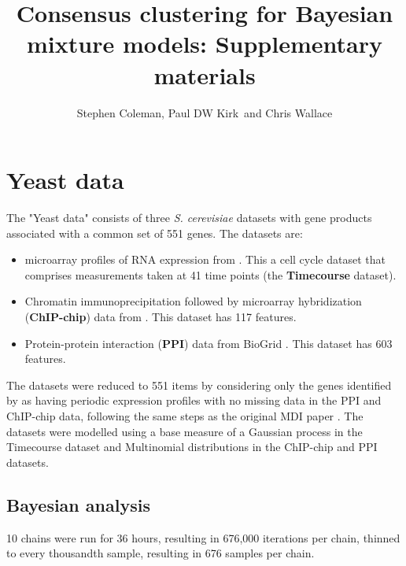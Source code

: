 \documentclass[]{article}
\title{Consensus clustering for Bayesian mixture models: Supplementary materials}
\author{Stephen Coleman, Paul DW Kirk\, and Chris Wallace}
\begin{document}
\maketitle

\begin{abstract}

\end{abstract}

\section{Yeast data}

The "Yeast data" consists of three \emph{S. cerevisiae} datasets with gene products associated with a common set of 551 genes. The datasets are:
\begin{itemize}
	\item microarray profiles of RNA expression from \cite{granovskaia2010high}. This a cell cycle dataset that comprises measurements taken at 41 time points (the \textbf{Timecourse} dataset).
	\item Chromatin immunoprecipitation followed by microarray hybridization (\textbf{ChIP-chip}) data from \cite{harbison2004transcriptional}. This dataset has 117 features.
	\item Protein-protein interaction (\textbf{PPI}) data from BioGrid \citep{stark2006biogrid}. This dataset has 603 features.
\end{itemize}
The datasets were reduced to 551 items by considering only the genes identified by \cite{granovskaia2010high} as having periodic expression profiles with no missing data in the PPI and ChIP-chip data, following the same steps as the original MDI paper \citep{kirk2012bayesian}. The datasets were modelled using a base measure of a Gaussian process in the Timecourse dataset and Multinomial distributions in the ChIP-chip and PPI datasets.

\subsection{Bayesian analysis}
10 chains were run for 36 hours, resulting in 676,000 iterations per chain, thinned to every thousandth sample, resulting in 676 samples per chain. 
\end{document}
